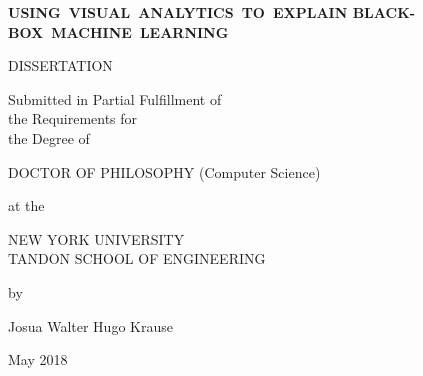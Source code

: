 \documentclass[12pt,draft,letterpaper]{report}
\newcommand{\thesistitle}{USING~VISUAL~ANALYTICS~TO~EXPLAIN
BLACK-BOX~MACHINE~LEARNING}
\newcommand{\thesisauthor}{Josua Walter Hugo Krause}
\newcommand{\graddate}{May 2018} %
\begin{document}
%
\setcounter{page}{1}
\thispagestyle{empty}
%
\begin{center}
{\bfseries 
  {\large\thesistitle}
  \vspace{.25in}
  
  DISSERTATION\\
  \vspace{.25in}
  
  \begin{doublespace}
  Submitted in Partial Fulfillment of\\
  the Requirements for\\
  the Degree of\\
  \end{doublespace}
  \vspace{.25in}
  
  DOCTOR OF PHILOSOPHY (Computer Science)\\
  \vspace{.25in}
  
  at the \\
  \vspace{.1in}
  
  {\large
  NEW YORK UNIVERSITY\\
  \vspace{-0.05in}
  TANDON SCHOOL OF ENGINEERING\\
  }
  \vspace{.2in}
  
  by
  \vspace{.3in}

  \thesisauthor
  \vspace{.3in}

  \graddate
}

\end{center}

\vspace{0.2in}

\noindent
{}
\vspace{0.1in}

\noindent
\makebox[\textwidth]{\hfill\makebox[2.5in]{\hrulefill}}\\
\vspace{0.05in}

\noindent
\makebox[\textwidth]{\hfill\makebox[2.5in]{\hrulefill}}\\
\end{document}
